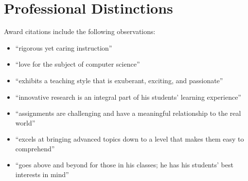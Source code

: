 \documentclass[11pt,letterpaper,sans]{moderncv/moderncv}
\begin{document}






\vspace*{-.175in}
\section{Professional Distinctions}

{Award citations include the following observations: \vspace*{.025in}
  \begin{itemize}
    \renewcommand\labelitemi{\Large\textbullet}
    \item ``rigorous yet caring instruction''
    \item ``love for the subject of computer science''
    \item ``exhibits a teaching style that is exuberant, exciting, and passionate''
    \item ``innovative research is an integral part of his students’ learning experience''
    \item ``assignments are challenging and have a meaningful relationship to the real world''
    \item ``excels at bringing advanced topics down to a level that makes them easy to comprehend''
    \item ``goes above and beyond for those in his classes; he has his students’ best interests in mind''
  \end{itemize}}
\end{document}
